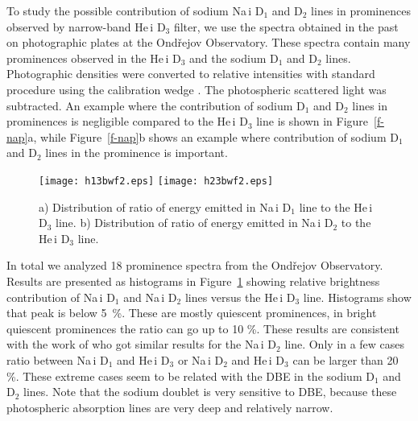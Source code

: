 \documentclass[namedreferences]{solarphysics}
\begin{document}
\begin{article}
To study the possible contribution of sodium Na\,{\sc i} D$_{1}$ and D$_{2}$ lines in prominences observed by narrow-band He\,{\sc i} D$_{3}$ filter, we use the spectra 
obtained in the past on photographic plates at the Ond\v{r}ejov Observatory. These spectra contain many prominences observed in the He\,{\sc i} D$_{3}$ and 
the sodium D$_{1}$ and D$_{2}$ lines. Photographic densities were converted to relative intensities with standard 
procedure using the calibration wedge \cite{Val59}. The photospheric scattered light was subtracted. An example where the contribution of sodium  D$_{1}$ and D$_{2}$ lines in prominences 
is negligible compared to the 
He\,{\sc i} D$_{3}$ line is shown in Figure~\ref{f-nap}a, while Figure~\ref{f-nap}b 
shows an example where contribution of  sodium D$_{1}$ and D$_{2}$ lines in the prominence is important.

\begin{figure}    %
\centerline{\texttt{[image: h13bwf2.eps]}
            \hspace*{0.0\textwidth}
            \texttt{[image: h23bwf2.eps]}
            }
\caption{a) Distribution of ratio of energy emitted in Na\,{\sc i} D${_1}$ line to the He\,{\sc i} D$_{3}$ line. b) Distribution of  ratio of energy emitted in 
Na\,{\sc i} D${_2}$ to the He\,{\sc i} D$_{3}$ line.}
\label{f-his}
\end{figure}

In total we analyzed 18 prominence spectra from the Ond\v{r}ejov Observatory. Results are presented as histograms in Figure~\ref{f-his}
showing relative brightness contribution of Na\,{\sc i} D$_{1}$ and Na\,{\sc i} D$_{2}$ lines versus 
the He\,{\sc i} D$_{3}$ line. Histograms show that peak is below 5~\%. These are mostly quiescent prominences, in bright quiescent prominences the ratio 
can go up to 10 \%. These results are consistent with the work of  who got similar results for the Na\,{\sc i} D$_{2}$ line. Only in a 
few cases ratio between Na\,{\sc i} D$_{1}$ and He\,{\sc i} D$_{3}$ or Na\,{\sc i} D$_{2}$ and He\,{\sc i} D$_{3}$ can be larger than 20 \%. 
These extreme cases seem to be related with the 
DBE in  the sodium D$_{1}$ and D$_{2}$ lines. Note that  the sodium doublet is  very sensitive to DBE, because 
these photospheric absorption lines are very deep and relatively narrow.  


\end{article}
\end{document}
